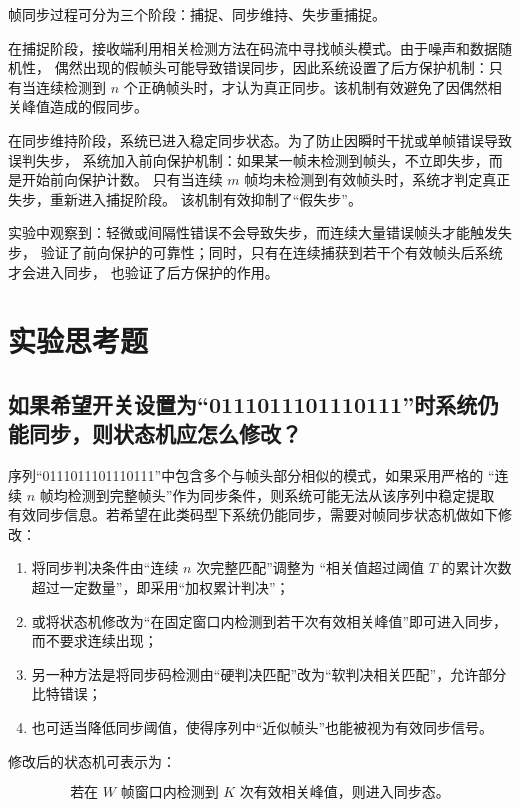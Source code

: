 \documentclass{xjtureport}
\begin{document}
帧同步过程可分为三个阶段：捕捉、同步维持、失步重捕捉。

在捕捉阶段，接收端利用相关检测方法在码流中寻找帧头模式。由于噪声和数据随机性，
偶然出现的假帧头可能导致错误同步，因此系统设置了后方保护机制：只有当连续检测到
$n$ 个正确帧头时，才认为真正同步。该机制有效避免了因偶然相关峰值造成的假同步。

在同步维持阶段，系统已进入稳定同步状态。为了防止因瞬时干扰或单帧错误导致误判失步，
系统加入前向保护机制：如果某一帧未检测到帧头，不立即失步，而是开始前向保护计数。
只有当连续 $m$ 帧均未检测到有效帧头时，系统才判定真正失步，重新进入捕捉阶段。
该机制有效抑制了“假失步”。

实验中观察到：轻微或间隔性错误不会导致失步，而连续大量错误帧头才能触发失步，
验证了前向保护的可靠性；同时，只有在连续捕获到若干个有效帧头后系统才会进入同步，
也验证了后方保护的作用。



\section{实验思考题}

\subsection{如果希望开关设置为“0111011101110111”时系统仍能同步，则状态机应怎么修改？}

序列“0111011101110111”中包含多个与帧头部分相似的模式，如果采用严格的
“连续 $n$ 帧均检测到完整帧头”作为同步条件，则系统可能无法从该序列中稳定提取
有效同步信息。若希望在此类码型下系统仍能同步，需要对帧同步状态机做如下修改：

\begin{enumerate}
	\item 将同步判决条件由“连续 $n$ 次完整匹配”调整为
	“相关值超过阈值 $T$ 的累计次数超过一定数量”，即采用“加权累计判决”；
	\item 或将状态机修改为“在固定窗口内检测到若干次有效相关峰值”即可进入同步，
	而不要求连续出现；
	\item 另一种方法是将同步码检测由“硬判决匹配”改为“软判决相关匹配”，允许部分比特错误；
	\item 也可适当降低同步阈值，使得序列中“近似帧头”也能被视为有效同步信号。
\end{enumerate}

修改后的状态机可表示为：

\[
\text{若在 } W \text{ 帧窗口内检测到 } K \text{ 次有效相关峰值，则进入同步态。}
\]
\end{document}
